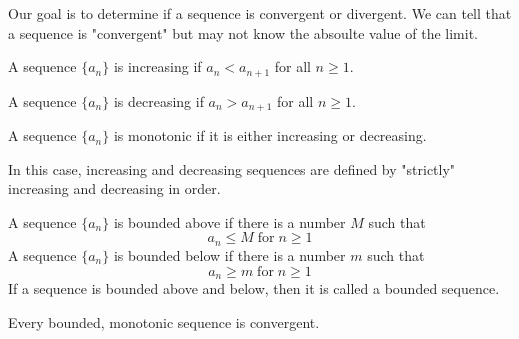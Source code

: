 Our goal is to determine if a sequence is convergent or divergent. We can tell that a sequence is "convergent" but may not know the absoulte value of the limit.

\begin{definition}
  A sequence \(\{a_{n}\}\) is increasing if \(a_{n} < a_{n + 1}\) for all \(n \ge 1\).
\end{definition}

\begin{definition}
  A sequence \(\{a_{n}\}\) is decreasing if \(a_{n} > a_{n + 1}\) for all \(n \ge 1\).
\end{definition}

\begin{definition}
  A sequence \(\{a_{n}\}\) is monotonic if it is either increasing or decreasing.
\end{definition}

\begin{remark}
  In this case, increasing and decreasing sequences are defined by "strictly" increasing and decreasing in order.
\end{remark}

\begin{definition}
  A sequence \(\{a_{n}\}\) is bounded above if there is a number \(M\) such that
  \[
    a_{n} \le M \; \mathrm{for} \; n \ge 1
  \]
  A sequence \(\{a_{n}\}\) is bounded below if there is a number \(m\) such that
  \[
    a_{n} \ge m \; \mathrm{for} \; n \ge 1
  \]
  If a sequence is bounded above and below, then it is called a bounded sequence.
\end{definition}

\begin{theorem}
  Every bounded, monotonic sequence is convergent.
\end{theorem}

